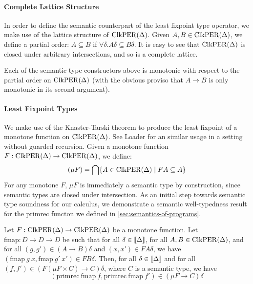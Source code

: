 \paragraph{Complete Lattice Structure} In order to define the semantic
counterpart of the least fixpoint type operator, we make use of the
lattice structure of $\mathrm{ClkPER}(\Delta)$. Given $A, B \in
\mathrm{ClkPER}(\Delta)$, we define a partial order: $A \subseteq B$ if
$\forall \delta. A\delta \subseteq B\delta$. It is easy to see that
$\mathrm{ClkPER}(\Delta)$ is closed under arbitrary intersections, and so is a
complete lattice.

Each of the semantic type constructors above is monotonic with respect
to the partial order on $\mathrm{ClkPER}(\Delta)$ (with the obvious proviso
that $A \to B$ is only monotonic in its second argument).

\paragraph{Least Fixpoint Types}
We make use of the Knaster-Tarski theorem \cite{tarski55lattice} to
produce the least fixpoint of a monotone function on
$\mathrm{ClkPER}(\Delta)$. See Loader \cite{loader97equational} for an similar
usage in a setting without guarded recursion. Given a monotone
function $F : \mathrm{ClkPER}(\Delta) \to \mathrm{ClkPER}(\Delta)$, we define:
\begin{displaymath}
  (\mu F) = \bigcap \{ A \in \mathrm{ClkPER}(\Delta) \mathrel| FA \subseteq A \}
\end{displaymath}
For any monotone $F$, $\mu F$ is immediately a semantic type by
construction, since semantic types are closed under intersection. As
an initial step towards semantic type soundness for our calculus, we
demonstrate a semantic well-typedness result for the
$\mathrm{primrec}$ functon we defined in
\autoref{sec:semantics-of-programs}.

\begin{lemma}\label{lem:primrec-well-typed}
  Let $F : \mathrm{ClkPER}(\Delta) \to \mathrm{ClkPER}(\Delta)$ be a monotone
  function.  Let $\mathrm{fmap} : D \to D \to D$ be such that for all
  $\delta \in \llbracket \Delta \rrbracket$, for all $A,B \in \mathrm{ClkPER}(\Delta)$, and
  for all $(g,g') \in (A \to B)\delta$ and $(x,x') \in FA\delta$, we
  have $(\mathrm{fmap}\ g\ x, \mathrm{fmap}\ g'\ x') \in FB\delta$.
  Then, for all $\delta \in \llbracket \Delta \rrbracket$ and for all $(f,f') \in
  (F(\mu F \times C) \to C)\delta$, where $C$ is a semantic type, we
  have
  \begin{displaymath}
    (\mathrm{primrec}\ \mathrm{fmap}\ f, \mathrm{primrec}\ \mathrm{fmap}\ f') \in (\mu F \to C)\delta
  \end{displaymath}
\end{lemma}

